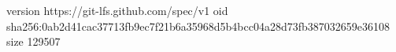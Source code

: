 version https://git-lfs.github.com/spec/v1
oid sha256:0ab2d41cac37713fb9ec7f21b6a35968d5b4bcc04a28d73fb387032659e36108
size 129507
